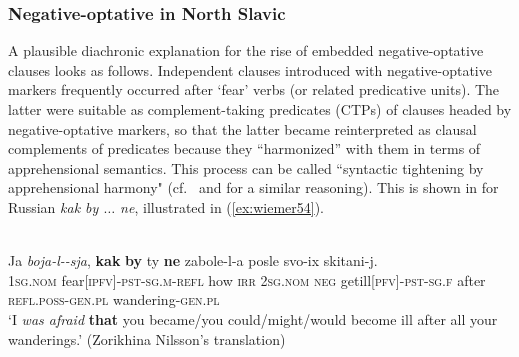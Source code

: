\documentclass[output=paper,colorlinks,citecolor=brown]{langscibook}
\begin{document}
\subsubsection{Negative-optative in North Slavic}
\label{subsubsec:negoptnorthslavic}


A plausible diachronic explanation for the rise of embedded negative-optative clauses looks as follows. Independent clauses introduced with negative-optative markers frequently occurred after `fear' verbs (or related predicative units). The latter were suitable as complement-taking predicates (CTPs) of clauses headed by negative-optative markers, so that the latter became reinterpreted as clausal complements of predicates because they ``harmonized'' with them in terms of apprehensional semantics. This process can be called ``syntactic tightening by apprehensional harmony" (cf.\ \citealt[54]{Nilsson2012} and \citealt[345--346]{Dobrushina2016} for a similar reasoning). This is shown in  for Russian \textit{kak by $\ldots$  ne}, illustrated in (\ref{ex:wiemer54}).





\ea 
\label{ex:wiemer54} 
\\
\gll Ja \textit{boja-l-\emptyset-sja}, \textbf{kak} \textbf{by} ty \textbf{ne} zabole-l-a posle svo-ix skitani-j. \\
\textsc{1sg.nom} fear\textsc{[ipfv]-pst-sg.m-refl} how \textsc{irr} \textsc{2sg.nom} \textsc{neg} get\textunderscore ill\textsc{[pfv]-pst-sg.f} after \textsc{refl.poss-gen.pl} wandering-\textsc{gen.pl} \\
\glt `I \textit{was afraid} \textbf{that} you became/you could/might/would become ill after all your wanderings.' (Zorikhina Nilsson's translation)
\z
\end{document}
